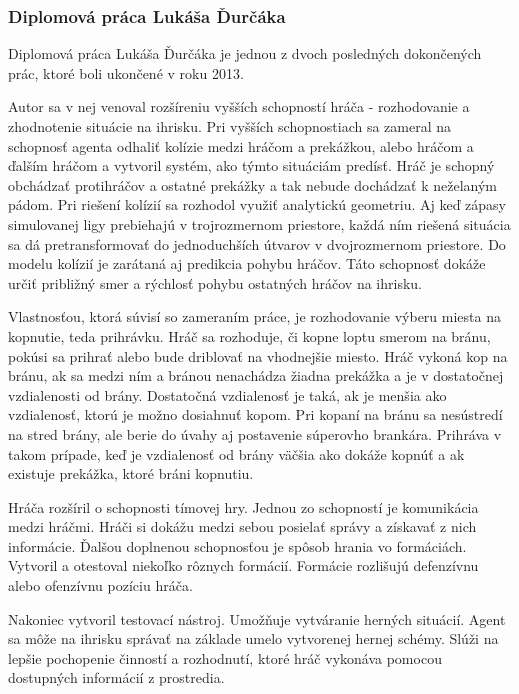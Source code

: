 \subsubsection{Diplomová práca Lukáša Ďurčáka} \label{sec_durcak}

Diplomová práca Lukáša Ďurčáka\cite{durcak} je jednou z dvoch posledných dokončených prác, ktoré boli ukončené v roku 2013.

Autor sa v nej venoval rozšíreniu vyšších schopností hráča - rozhodovanie a zhodnotenie situácie na ihrisku. Pri vyšších schopnostiach sa zameral na schopnosť agenta odhaliť kolízie medzi hráčom a prekážkou, alebo hráčom a ďalším hráčom a vytvoril systém, ako týmto situáciám predísť. Hráč je schopný obchádzať protihráčov a ostatné prekážky a tak nebude dochádzať k neželaným pádom. Pri riešení kolízií sa rozhodol využiť analytickú geometriu. Aj keď zápasy simulovanej ligy prebiehajú v trojrozmernom priestore, každá ním riešená situácia sa dá pretransformovať do jednoduchších útvarov v dvojrozmernom priestore. Do modelu kolízií je zarátaná aj predikcia pohybu hráčov. Táto schopnosť dokáže určiť približný smer a rýchlosť pohybu ostatných hráčov na ihrisku. 

Vlastnosťou, ktorá súvisí so zameraním práce, je rozhodovanie výberu miesta na kopnutie, teda prihrávku. Hráč sa rozhoduje, či kopne loptu smerom na bránu, pokúsi sa prihrať alebo bude driblovať na vhodnejšie miesto. Hráč vykoná kop na bránu, ak sa medzi ním a bránou nenachádza žiadna prekážka a je v dostatočnej vzdialenosti od brány. Dostatočná vzdialenosť je taká, ak je menšia ako vzdialenosť, ktorú je možno dosiahnuť kopom. Pri kopaní na bránu sa nesústredí na stred brány, ale berie do úvahy aj postavenie súperovho brankára. Prihráva v takom prípade, keď je vzdialenosť od brány väčšia ako dokáže kopnúť a ak existuje prekážka, ktoré bráni kopnutiu.

Hráča rozšíril o schopnosti tímovej hry. Jednou zo schopností je komunikácia medzi hráčmi. Hráči si dokážu medzi sebou posielať správy a získavať z nich informácie. Ďalšou doplnenou schopnosťou je spôsob hrania vo formáciách. Vytvoril a otestoval niekoľko rôznych formácií. Formácie rozlišujú defenzívnu alebo ofenzívnu pozíciu hráča.

Nakoniec vytvoril testovací nástroj. Umožňuje vytváranie herných situácií. Agent sa môže na ihrisku správať na základe umelo vytvorenej hernej schémy. Slúži na lepšie pochopenie činností a rozhodnutí, ktoré hráč vykonáva pomocou dostupných informácií z prostredia.